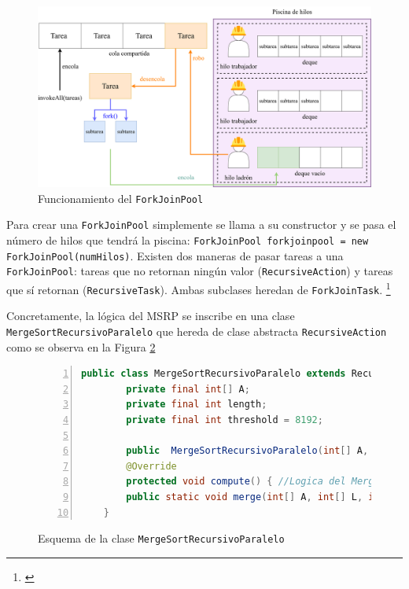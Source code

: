 \documentclass[titlepage]{article}
\begin{document}
\begin{figure}
    \centering
    \includegraphics[width=0.85\linewidth]{Diagrames/forkJoinPool.png}
    \caption{Funcionamiento del \lstinline{ForkJoinPool}}
    \label{fig:forkJoinPool}
\end{figure}

Para crear una \lstinline{ForkJoinPool} simplemente se llama a su constructor y se pasa el número de hilos que tendrá la piscina: \lstinline{ForkJoinPool forkjoinpool = new ForkJoinPool(numHilos)}. Existen dos maneras de pasar tareas a una \lstinline{ForkJoinPool}: tareas que no retornan ningún valor (\lstinline{RecursiveAction}) y tareas que sí retornan (\lstinline{RecursiveTask}). Ambas subclases heredan de \lstinline{ForkJoinTask}. \footnote{\cite{OracleForkJoin}}

Concretamente, la lógica del MSRP se inscribe en una clase \lstinline{MergeSortRecursivoParalelo} que hereda de clase abstracta \lstinline{RecursiveAction} como se observa en la Figura \ref{fig:MSRP_RecursiveAction}

\begin{figure}[hbtp]
    \begin{lstlisting}[language=java, frame=single, numbers=left]
    public class MergeSortRecursivoParalelo extends RecursiveAction {
        private final int[] A;
        private final int length;
        private final int threshold = 8192;
        
        public  MergeSortRecursivoParalelo(int[] A, int length){ //Constructor }
        @Override
        protected void compute() { //Logica del Merge Sort }
        public static void merge(int[] A, int[] L, int[] R, int left, int right) {    }
    }
    \end{lstlisting}
    \caption{Esquema de la clase \lstinline{MergeSortRecursivoParalelo}}
    \label{fig:MSRP_RecursiveAction}
\end{figure}
\end{document}
